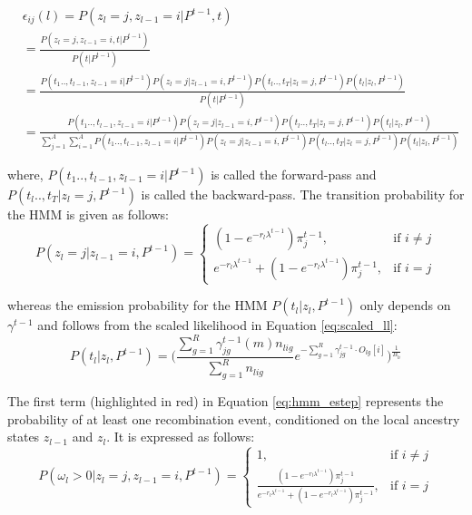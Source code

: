 \begin{footnotesize}
\begin{align}
    &\epsilon_{ij}(l) =P(z_l = j, z_{l-1} = i \vert P^{t-1}, t) \nonumber \\
    &= \frac{P(z_l = j, z_{l-1} = i, t \vert P^{t-1})}{P(t \vert P^{t-1})} \nonumber \\
    &= \frac{P(t_1 .., t_{l-1}, z_{l-1}=i \vert P^{t-1}) P(z_l=j \vert z_{l-1}=i, P^{t-1}) P(t_{l} .., t_T \vert z_l=j, P^{t-1}) P(t_l \vert z_l, P^{t-1})}{P(t \vert P^{t-1})} \nonumber \\
    &= \frac{P(t_1 .., t_{l-1}, z_{l-1}=i \vert P^{t-1}) P(z_l=j \vert z_{l-1}=i, P^{t-1}) P(t_{l} .., t_T \vert z_l=j, P^{t-1}) P(t_l \vert z_l, P^{t-1})}{\sum\limits_{j=1}^{A}\sum\limits_{i=1}^{A} P(t_1 .., t_{l-1}, z_{l-1}=i \vert P^{t-1}) P(z_l=j \vert z_{l-1}=i, P^{t-1}) P(t_{l} .., t_T \vert z_l=j, P^{t-1}) P(t_l \vert z_l, P^{t-1})}
\label{eq:epsilon_ij}
\end{align}
\end{footnotesize}
where, $P(t_1 .., t_{l-1}, z_{l-1}=i \vert P^{t-1})$ is called the forward-pass and $P(t_{l} .., t_T \vert z_l=j, P^{t-1})$ is called the backward-pass. The transition probability for the HMM is given as follows:
\begin{equation}
     P(z_l=j \vert z_{l-1}=i, P^{t-1}) = \begin{cases} (1 - e^{-r_l \lambda^{t-1}})\pi_j^{t-1}, & \text{if } i \neq j \\ e^{-r_l \lambda^{t-1}} + (1 - e^{-r_l \lambda^{t-1}})\pi_j^{t-1} , & \text{if } i = j \end{cases}
\end{equation}

whereas the emission probability for the HMM $P(t_l \vert z_l, P^{t-1})$ only depends on $\gamma^{t-1}$ and follows from the scaled likelihood in Equation \ref{eq:scaled_ll}:
\begin{equation}
   P(t_l \vert z_l, P^{t-1}) =  \Big( \frac{\sum_{g=1}^R\gamma^{t-1}_{jg}(m)n_{lig}}{\sum_{g=1}^R n_{lig}}e^{-\sum_{g=1}^R \gamma^{t-1}_{jg} \cdot O_{lg}[i]} \Big)^{\frac{1}{B_{li}}}
\end{equation}

The first term (highlighted in red) in Equation \ref{eq:hmm_estep} represents the probability of at least one recombination event, conditioned on the local ancestry states $z_{l-1}$ and $z_l$. It is expressed as follows:
\begin{equation}
  P(\omega_l > 0 \vert z_l = j, z_{l-1} = i, P^{t-1}) = \begin{cases} 1, & \text{if } i \neq j \\ \frac{(1 - e^{-r_l \lambda^{t-1}})\pi_j^{t-1}}{e^{-r_l \lambda^{t-1}} + (1 - e^{-r_l \lambda^{t-1}})\pi_j^{t-1}} , & \text{if } i = j \end{cases}
\label{eq:e_of_recomb>0}
\end{equation}


